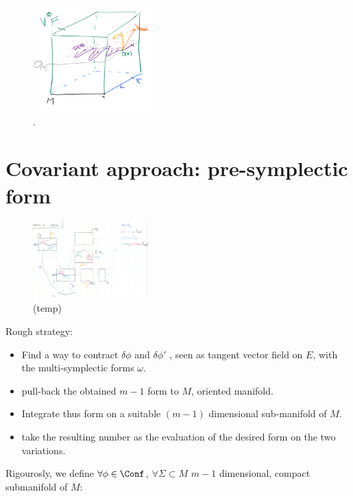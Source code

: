 \documentclass[a4paper,12pt,fleqn]{scrartcl}  %
\begin{document}
\begin{figure}
  \centering
  \includegraphics[width=0.41\textwidth]{Pictures/fieldJacobi.png}
  \caption{.}
\end{figure}



\clearpage \newpage
\section{Covariant approach: pre-symplectic form}
\begin{figure}
\centering
\includegraphics[width=0.40\textwidth]{Pictures/symform.png}
  \caption{(temp)}
\end{figure}

Rough strategy:
\begin{itemize}
	\item Find a way to contract $\delta \phi$ and $\delta \phi '$ , seen as tangent vector field on $E$, with the multi-symplectic forms $\omega$.
	\item pull-back the obtained $m-1$ form to $M$, oriented manifold.
	\item Integrate thus form on a suitable $(m-1)$ dimensional sub-manifold of $M$.
	\item take the resulting number as the evaluation of the desired form on the two variations.  
\end{itemize}

Rigourosly, we define $\forall \phi \in \Conf$, $\forall \Sigma \subset M$ $m-1$ dimensional, compact submanifold of $M$:
\end{document}
